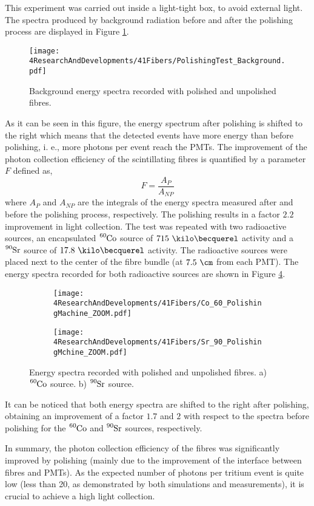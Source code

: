 This experiment was carried out inside a light-tight box, to avoid external light. The spectra produced by background radiation before and after the polishing process are displayed in Figure \ref{fig:ResultsOfPolishingMachineBackground}.
\begin{figure}[]
\centering
\texttt{[image: 4ResearchAndDevelopments/41Fibers/PolishingTest\_Background.pdf]}
\caption{Background energy spectra recorded with polished and unpolished fibres.\label{fig:ResultsOfPolishingMachineBackground}}
\end{figure}
As it can be seen in this figure, the energy spectrum after polishing is shifted to the right which means that the detected events have more energy than before polishing, i. e., more photons per event reach the PMTs. The improvement of the photon collection efficiency of the scintillating fibres is quantified by a parameter $F$ defined as,
\begin{equation}
F=\frac{A_{P}}{A_{NP}}
\label{eq:RelativeImprovement}
\end{equation}
where $A_{P}$ and $A_{NP}$ are the integrals of the energy spectra measured after and before the polishing process, respectively. The polishing results in a factor $2.2$ improvement in light collection. The test was repeated with two radioactive sources, an encapsulated $\ce{^{60}Co}$ source of $715~\kilo\becquerel$ activity and a $\ce{^{90}Sr}$ source of $17.8~\kilo\becquerel$ activity. The radioactive sources were placed next to the center of the fibre bundle (at $7.5~\cm$ from each PMT). The energy spectra recorded for both radioactive sources are shown in Figure \ref{fig:ResultsOfPolishingMachineSources}.
\begin{figure}
\centering
    \begin{subfigure}[b]{1\textwidth}
    \centering
    \texttt{[image: 4ResearchAndDevelopments/41Fibers/Co\_60\_PolishingMachine\_ZOOM.pdf]}  
    \caption{\label{subfig:EnergySpectrumCo60PolishingTest}}
    \end{subfigure}
    \hfill
    \begin{subfigure}[b]{1\textwidth}
    \centering
    \texttt{[image: 4ResearchAndDevelopments/41Fibers/Sr\_90\_PolishingMchine\_ZOOM.pdf]}  
    \caption{\label{subfig:EnergySpectrumSr90PolishingTest}}
    \end{subfigure}
 \caption{Energy spectra recorded with polished and unpolished fibres. a) $\ce{^{60}Co}$ source. b) $\ce{^{90}Sr}$ source.}
 \label{fig:ResultsOfPolishingMachineSources}
\end{figure}
It can be noticed that both energy spectra are shifted to the right after polishing, obtaining an improvement of a factor $1.7$ and $2$ with respect to the spectra before polishing for the $\ce{^{60}Co}$ and $\ce{^{90}Sr}$ sources, respectively. 

In summary, the photon collection efficiency of the fibres was significantly improved by polishing (mainly due to the improvement of the interface between fibres and PMTs). As the expected number of photons per tritium event is quite low (less than 20, as demonstrated by both simulations and measurements), it is crucial to achieve a high light collection.